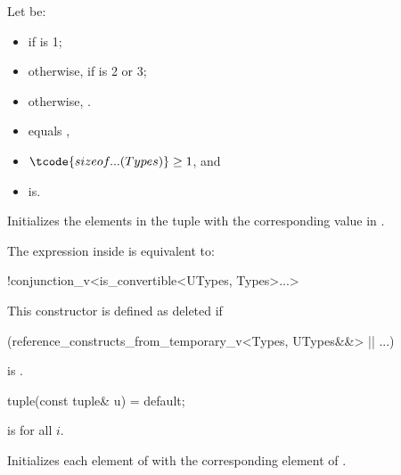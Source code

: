 \begin{itemdescr}
\pnum
Let  be:
\begin{itemize}
\item
{}
if  is 1;
\item
otherwise,
if  is 2 or 3;
\item
otherwise, .
\end{itemize}

\pnum
\constraints
\begin{itemize}
\item
{} equals ,
\item
$\tcode{sizeof...(Types)} \geq 1$, and
\item
{} is\newline {}.
\end{itemize}

\pnum
\effects
Initializes the elements in the tuple with the
corresponding value in .

\pnum
\remarks
The expression inside  is equivalent to:
\begin{codeblock}
!conjunction_v<is_convertible<UTypes, Types>...>
\end{codeblock}
This constructor is defined as deleted if
\begin{codeblock}
(reference_constructs_from_temporary_v<Types, UTypes&&> || ...)
\end{codeblock}
is .
\end{itemdescr}

%
\begin{itemdecl}
tuple(const tuple& u) = default;
\end{itemdecl}

\begin{itemdescr}
\pnum
\mandates
{} is  for all $i$.

\pnum
\effects
Initializes each element of  with the
corresponding element of .
\end{itemdescr}

